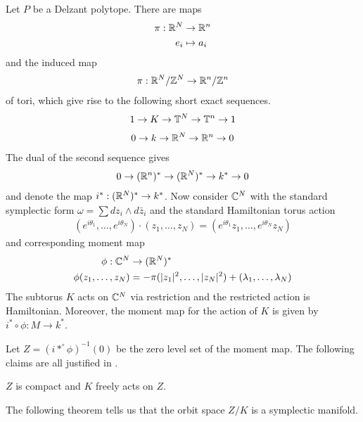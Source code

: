 Let $P$ be a Delzant polytope.
There are maps \begin{align*}
    \pi:\mathbb{R}^N&\to\mathbb{R}^n\\
    e_i &\mapsto a_i
\end{align*} and the induced map \begin{align*}
    \pi: \mathbb{R}^N/\mathbb{Z}^N\to\mathbb{R}^n/\mathbb{Z}^n 
\end{align*} of tori, which give rise to the following short exact sequences. \begin{align}\label{eq:ses1}
    1\to K \to \mathbb{T}^N \to \mathbb{T}^n \to 1
\end{align} \begin{align*}
    0\to k \to \mathbb{R}^N\to \mathbb{R}^n\to 0
\end{align*} The dual of the second sequence gives \begin{align*}
    0 \to (\mathbb{R}^n)^* \to (\mathbb{R}^N)^* \to k^* \to 0
\end{align*} and denote the map $i^* : (\mathbb{R}^N)^*\to k^*$. Now consider $\mathbb{C}^N$
with the standard symplectic form $\omega = \sum dz_i\wedge d\bar z_i$ and the 
standard Hamiltonian torus action \begin{align*}
    (e^{i\theta_1},\dots,e^{i\theta_N})\cdot(z_1,\dots,z_N) = (e^{i\theta_1}z_1,\dots,e^{i\theta_N}z_N)
\end{align*} and corresponding moment map \begin{align*}
    \phi:\mathbb{C}^N&\to(\mathbb{R}^N)^* \\
    \phi(z_1,\dots,z_N) &= -\pi(|z_1|^2,\dots,|z_N|^2) + (\lambda_1,\dots,\lambda_N)
\end{align*}
The subtorus $K$ acts on $\mathbb{C}^N$ via restriction and the restricted action is 
Hamiltonian. Moreover, the moment map for the action of $K$ is given by $i^*\circ\phi:M\to k^*$.

\hfill

Let $Z = (i*^\circ \phi)^{-1}(0)$ be the zero level set of the moment map. The following 
claims are all justified in \cite{lsg}.

\begin{lemma}
    $Z$ is compact and $K$ freely acts on $Z$. 
\end{lemma}

The following theorem tells us that the orbit space $Z/K$ is a symplectic manifold.

